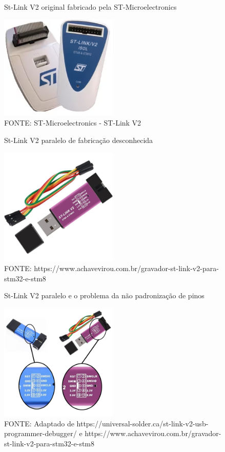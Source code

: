\begin{figure}[ht]
	\centering
	\caption{St-Link V2 original fabricado pela ST-Microelectronics \cite{st_link_v2}}
	\includegraphics[width=0.5\textwidth]{figures/stlinkv2_original}
	\caption*{FONTE: ST-Microelectronics - ST-Link V2}
    \label{stlinkv2_original}
\end{figure}


\begin{figure}[ht]
	\centering
	\caption{St-Link V2 paralelo de fabricação desconhecida \cite{stlinkv2_cheap_ref}}
	\includegraphics[width=0.5\textwidth]{figures/stlinkv2_cheap}
	\caption*{FONTE: https://www.achavevirou.com.br/gravador-st-link-v2-para-stm32-e-stm8}
    \label{stlinkv2_cheap}
\end{figure}


\begin{figure}[htb]
	\centering
	\caption{St-Link V2 paralelo e o problema da não padronização de pinos}
	\includegraphics[width=0.5\textwidth]{figures/stlinkv2_cheap_pin_diff}
	\caption*{
		FONTE: Adaptado de https://universal-solder.ca/st-link-v2-usb-programmer-debugger/
		e https://www.achavevirou.com.br/gravador-st-link-v2-para-stm32-e-stm8
	}
    \label{stlinkv2_cheap_pin_diff}
\end{figure}

